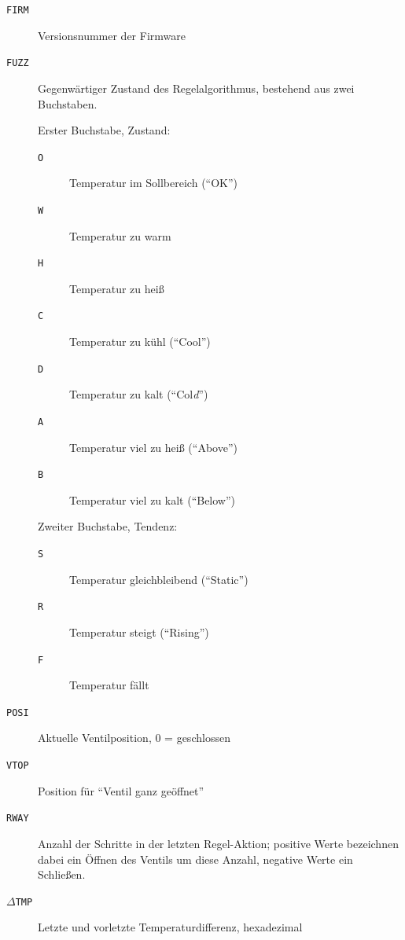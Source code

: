 \documentclass[a4paper]{article}
\begin{document}
\begin{description}
\item[\texttt{FIRM}] Versionsnummer der Firmware
\item[\texttt{FUZZ}] Gegenwärtiger Zustand des Regelalgorithmus,
  bestehend aus zwei Buchstaben.

  Erster Buchstabe, Zustand:
  \begin{description}
  \item[\texttt{O}] Temperatur im Sollbereich ("`OK"')
  \item[\texttt{W}] Temperatur zu warm
  \item[\texttt{H}] Temperatur zu heiß
  \item[\texttt{C}] Temperatur zu kühl ("`Cool"')
  \item[\texttt{D}] Temperatur zu kalt ("`Col\emph{d}"')
  \item[\texttt{A}] Temperatur viel zu heiß ("`Above"')
  \item[\texttt{B}] Temperatur viel zu kalt ("`Below"')
  \end{description}

  Zweiter Buchstabe, Tendenz:
  \begin{description}
  \item[\texttt{S}] Temperatur gleichbleibend ("`Static"')
  \item[\texttt{R}] Temperatur steigt ("`Rising"')
  \item[\texttt{F}] Temperatur fällt
  \end{description}
\item[\texttt{POSI}] Aktuelle Ventilposition, 0 = geschlossen\label{menu:dbg-posi}
\item[\texttt{VTOP}] Position für "`Ventil ganz geöffnet"'
\item[\texttt{RWAY}] Anzahl der Schritte in der letzten Regel-Aktion; positive
  Werte bezeichnen dabei ein Öffnen des Ventils um diese Anzahl, negative
  Werte ein Schließen.
\item[\texttt{$\Delta$TMP}] Letzte und vorletzte Temperaturdifferenz, hexadezimal
\end{description}
\end{document}
